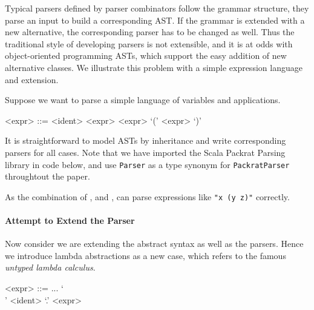 Typical parsers defined by parser combinators follow the grammar
structure, they parse an input to build a corresponding AST. If the grammar is extended
with a new alternative, the corresponding parser has to be changed as
well. Thus the traditional style of developing parsers is not
extensible, and it is at odds with object-oriented programming ASTs,
which support the easy addition of new alternative classes. We
illustrate this problem with a simple expression language and extension.

Suppose we want to parse a simple language of variables and
applications.

\setlength{\grammarindent}{5em}
\begin{grammar}
<expr> ::= <ident>
    \alt <expr> <expr>
    \alt `(' <expr> `)'
\end{grammar}

It is straightforward to model ASTs by inheritance and write corresponding parsers for all cases. Note that we have imported
the Scala Packrat Parsing library in code below, and use \lstinline{Parser} as a type synonym for \lstinline{PackratParser} throughtout the paper. 



\noindent As the combination of ,  and ,  can parse expressions like \lstinline{"x (y z)"} correctly.

\paragraph{Attempt to Extend the Parser} Now consider we are extending the abstract syntax as well as the parsers. Hence we introduce lambda abstractions as a new case, which refers to the famous \textit{untyped lambda calculus}.

\setlength{\grammarindent}{5em}
\begin{grammar}
<expr> ::= ...
    \alt `\\' <ident> `.' <expr>
\end{grammar}

